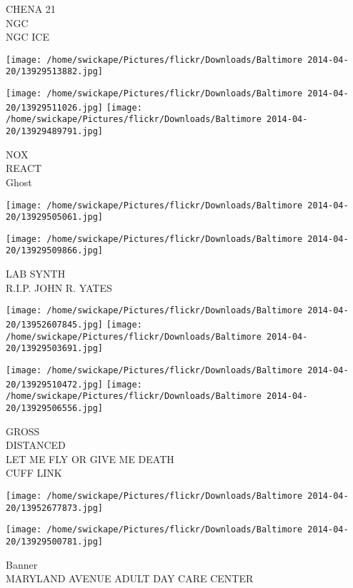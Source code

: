 \documentclass[10pt,letterpaper]{article}
\begin{document}
CHENA 21\\
NGC\\
NGC ICE\\
\pagebreak

\texttt{[image: /home/swickape/Pictures/flickr/Downloads/Baltimore 2014-04-20/13929513882.jpg]}

\vspace{0.25in}
\texttt{[image: /home/swickape/Pictures/flickr/Downloads/Baltimore 2014-04-20/13929511026.jpg]}
\texttt{[image: /home/swickape/Pictures/flickr/Downloads/Baltimore 2014-04-20/13929489791.jpg]}

NOX\\
REACT\\
Ghost\\
\pagebreak

\texttt{[image: /home/swickape/Pictures/flickr/Downloads/Baltimore 2014-04-20/13929505061.jpg]}

\vspace{0.25in}
\texttt{[image: /home/swickape/Pictures/flickr/Downloads/Baltimore 2014-04-20/13929509866.jpg]}

LAB SYNTH\\
R.I.P. JOHN R. YATES\\
\pagebreak

\texttt{[image: /home/swickape/Pictures/flickr/Downloads/Baltimore 2014-04-20/13952607845.jpg]}
\texttt{[image: /home/swickape/Pictures/flickr/Downloads/Baltimore 2014-04-20/13929503691.jpg]}

\texttt{[image: /home/swickape/Pictures/flickr/Downloads/Baltimore 2014-04-20/13929510472.jpg]}
\texttt{[image: /home/swickape/Pictures/flickr/Downloads/Baltimore 2014-04-20/13929506556.jpg]}

GROSS\\
DISTANCED\\
LET ME FLY OR GIVE ME DEATH\\
CUFF LINK\\
\pagebreak

\texttt{[image: /home/swickape/Pictures/flickr/Downloads/Baltimore 2014-04-20/13952677873.jpg]}

\vspace{0.25in}
\texttt{[image: /home/swickape/Pictures/flickr/Downloads/Baltimore 2014-04-20/13929500781.jpg]}

Banner\\
MARYLAND AVENUE ADULT DAY CARE CENTER\\
\pagebreak
\end{document}
